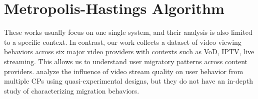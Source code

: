 
\section{Metropolis-Hastings Algorithm} \label{sec:metropolis_hastings}


These works usually focus on one single system, and their analysis is also limited to a specific context. In contrast, our work collects a dataset of video viewing behaviors across six major video providers with contexts such as VoD, IPTV, live streaming. This allows us to understand user migratory patterns across content providers. \cite{roberts1997weak} analyze the influence of video stream quality on user behavior from multiple CPs using quasi-experimental designs, but they do not have an in-depth study of characterizing migration behaviors.  

